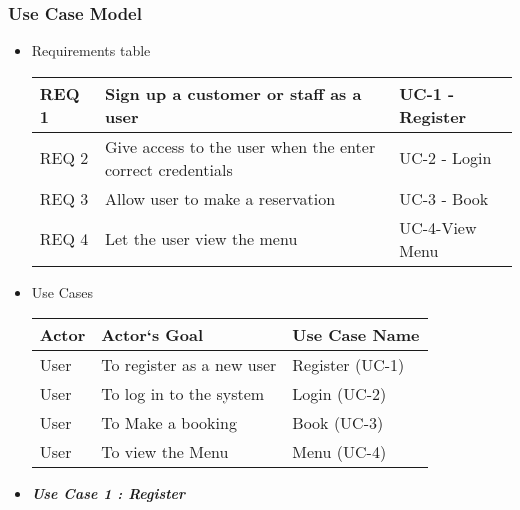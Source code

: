 \documentclass[15, notitlepage]{article}
\begin{document}
\subsubsection{Use Case Model}
\begin{itemize}
\item Requirements table
	\begin{center}
		\begin{tabular}{ |l| l | l| }
			\hline
			REQ 1 & Sign up a customer or staff as a user & UC-1 - Register \\
			\hline
			REQ 2 & Give access to the user when the enter correct credentials & UC-2 - Login \\
			\hline
			REQ 3 & Allow user to make a reservation & UC-3 - Book \\
			\hline
			REQ 4 & Let the user view the menu & UC-4-View Menu\\
			\hline
		\end{tabular}
		
	\end{center}
\item Use Cases
\begin{center}
	\begin{tabular}{l| l| l}
		\hline
		\rowcolor{yellow}
		Actor & Actor`s Goal & Use Case Name\\
		\hline
		User & To register as a new user & Register (UC-1)\\
		User & To log in to the system & Login (UC-2)\\
		User & To Make a booking & Book (UC-3)\\
		User & To view the Menu & Menu (UC-4)
	\end{tabular}
\end{center}

\newpage

\item   \textit{\textbf{Use Case 1 : Register}}
\begin{center}
	\begin{tabular}{|l l|}
		

\end{tabular}
\end{center}
\end{itemize}
\end{document}
